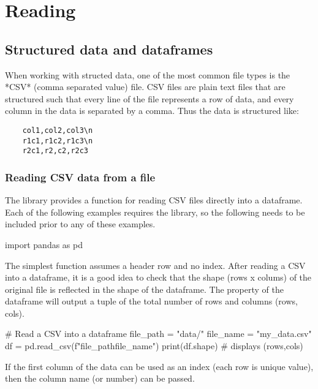\chapter{Reading}
\label{chapter:reading}

\section{Structured data and dataframes}

When working with structed data, one of the most common file types is the *CSV* (comma separated value) file. CSV files are plain text files that are structured such that every line of the file represents a row of data, and every column in the data is separated by a comma. Thus the data is structured like:

\begin{verbatim}
    col1,col2,col3\n
    r1c1,r1c2,r1c3\n
    r2c1,r2,c2,r2c3
\end{verbatim}

\subsection{Reading CSV data from a file}

The  library provides a function for reading CSV files directly into a dataframe.
Each of the following examples requires the library, so the following  needs to be included prior to any of these examples.

\begin{pycode}
    import pandas as pd
\end{pycode}

The simplest  function assumes a header row and no index. After reading a CSV into a dataframe, it is a good idea to check that the shape (rows x colums) of the original  file is reflected in the shape of the dataframe. The  property of the dataframe will output a tuple of the total number of rows and columns (rows, cols).

\begin{pycode}
    # Read a CSV into a dataframe
    file_path = "data/"
    file_name = "my_data.csv"
    df = pd.read_csv(f"{file_path}{file_name}")
    print(df.shape) # displays (rows,cols)
\end{pycode}

If the first column of the data can be used as an index (each row is unique value), then the column name (or number) can be passed.

